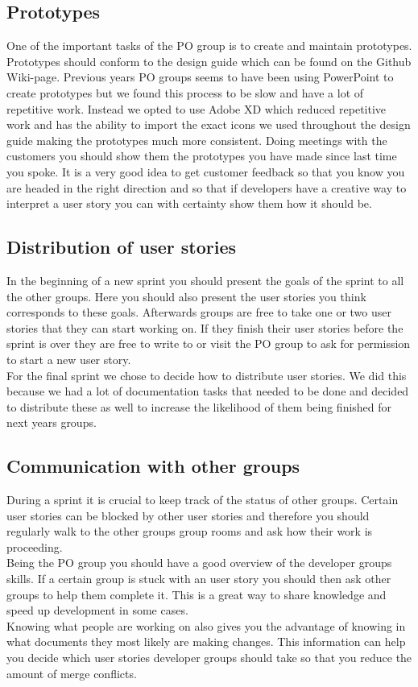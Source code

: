 \subsection{Prototypes}
One of the important tasks of the PO group is to create and maintain prototypes.
Prototypes should conform to the design guide which can be found on the Github Wiki-page.
Previous years PO groups seems to have been using PowerPoint to create prototypes but we found this process to be slow and have a lot of repetitive work.
Instead we opted to use Adobe XD which reduced repetitive work and has the ability to import the exact icons we used throughout the design guide making the prototypes much more consistent.
Doing meetings with the customers you should show them the prototypes you have made since last time you spoke.
It is a very good idea to get customer feedback so that you know you are headed in the right direction and so that if developers have a creative way to interpret a user story you can with certainty show them how it should be.

\subsection{Distribution of user stories}
In the beginning of a new sprint you should present the goals of the sprint to all the other groups.
Here you should also present the user stories you think corresponds to these goals.
Afterwards groups are free to take one or two user stories that they can start working on.
If they finish their user stories before the sprint is over they are free to write to or visit the PO group to ask for permission to start a new user story.
\\
For the final sprint we chose to decide how to distribute user stories.
We did this because we had a lot of documentation tasks that needed to be done and decided to distribute these as well to increase the likelihood of them being finished for next years groups.


\subsection{Communication with other groups}
During a sprint it is crucial to keep track of the status of other groups.
Certain user stories can be blocked by other user stories and therefore you should regularly walk to the other groups group rooms and ask how their work is proceeding.
\\
Being the PO group you should have a good overview of the developer groups skills.
If a certain group is stuck with an user story you should then ask other groups to help them complete it.
This is a great way to share knowledge and speed up development in some cases.
\\
Knowing what people are working on also gives you the advantage of knowing in what documents they most likely are making changes.
This information can help you decide which user stories developer groups should take so that you reduce the amount of merge conflicts.


